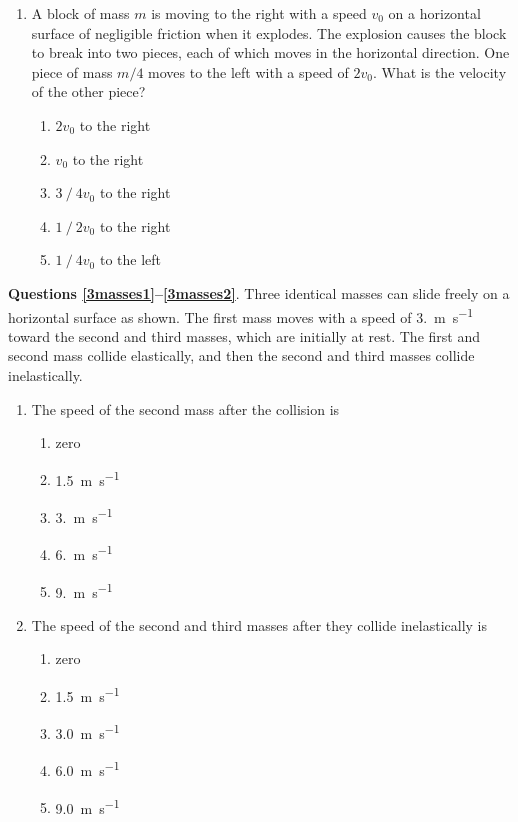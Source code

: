 \documentclass{../../../oss-apphys}
\begin{document}
\begin{multicols}{2}
\begin{enumerate}[leftmargin=18pt,resume]
  \item A block of mass $m$ is moving to the right with a speed $v_0$ on a
    horizontal surface of negligible friction when it explodes. The explosion
    causes the block to break into two pieces, each of which moves in the
    horizontal direction. One piece of mass $m/4$ moves to the left with a
    speed of $2v_0$. What is the velocity of the other piece?
    \begin{enumerate}[noitemsep,topsep=0pt,leftmargin=18pt,label=(\Alph*)]
    \item$2v_0$ to the right
    \item$v_0$ to the right
    \item$3⁄4 v_0$ to the right
    \item$1⁄2 v_0$ to the right
    \item$1⁄4 v_0$ to the left
    \end{enumerate}
  \end{enumerate}
  \columnbreak
  
  \textbf{Questions \ref{3masses1}--\ref{3masses2}}. Three identical masses can
  slide freely on a horizontal surface as shown. The first mass moves with a
  speed of \SI{3.}{\metre\per\second} toward the second and third masses, which
  are initially at rest. The first and second mass collide elastically, and
  then the second and third masses collide inelastically.
  \begin{center}
  \end{center}
  \begin{enumerate}[leftmargin=18pt,resume]
  \item The speed of the second mass after the collision is
    \label{3masses1}
    \begin{enumerate}[noitemsep,topsep=0pt,leftmargin=18pt,label=(\Alph*)]
    \item zero
    \item\SI{1.5}{\metre\per\second}
    \item\SI{3.}{\metre\per\second}
    \item\SI{6.}{\metre\per\second}
    \item\SI{9.}{\metre\per\second}
    \end{enumerate}

  \item The speed of the second and third masses after they collide
    inelastically is
    \label{3masses2}
    \begin{enumerate}[noitemsep,topsep=0pt,leftmargin=18pt,label=(\Alph*)]
    \item zero
    \item\SI{1.5}{\metre\per\second}
    \item\SI{3.0}{\metre\per\second}
    \item\SI{6.0}{\metre\per\second}
    \item\SI{9.0}{\metre\per\second}
    \end{enumerate}
 

\end{enumerate}
\end{multicols}
\end{document}
